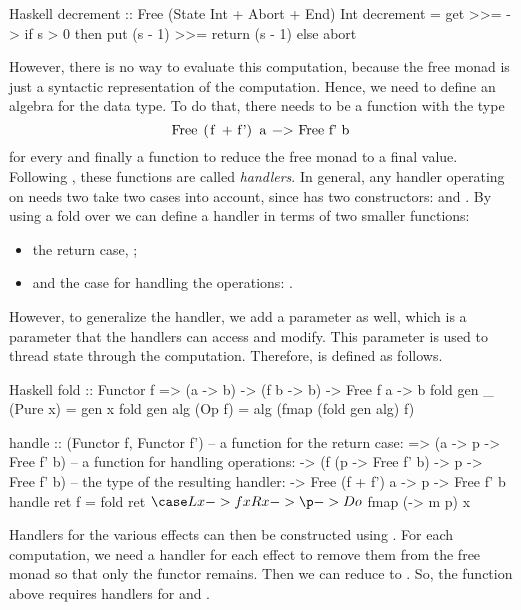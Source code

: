 \begin{lst}{Haskell}
decrement :: Free (State Int + Abort + End) Int
decrement = get >>= \s ->
              if s > 0
              then put (s - 1) >>= return (s - 1)
              else abort 
\end{lst}
%
However, there is no way to evaluate this computation, because the free monad is just a syntactic representation of the computation. Hence, we need to define an algebra for the  data type. To do that, there needs to be a function with the type
\[\mcode{Free (f + f') a -> Free f' b}\]
for every  and finally a function  to reduce the free monad to a final value. Following \textcite{castagna_handlers_2009}, these functions are called \emph{handlers}. In general, any handler operating on  needs two take two cases into account, since  has two constructors:  and . By using a fold over  we can define a handler in terms of two smaller functions:
\begin{itemize}
    \item the return case, ;
    \item and the case for handling the operations: .
\end{itemize}
However, to generalize the handler, we add a parameter  as well, which is a parameter that the handlers can access and modify. This parameter is used to thread state through the computation. Therefore,  is defined as follows.

\begin{lst}{Haskell}
fold :: Functor f => (a -> b) -> (f b -> b) -> Free f a -> b
fold gen _   (Pure x) = gen x
fold gen alg (Op f)   = alg (fmap (fold gen alg) f)

handle :: (Functor f, Functor f')
          -- a function for the return case:
       => (a -> p -> Free f' b)
          -- a function for handling operations:
       -> (f (p -> Free f' b) -> p -> Free f' b)
          -- the type of the resulting handler: 
       -> Free (f + f') a -> p -> Free f' b
handle ret f = fold ret $
  \case
    L x -> f x
    R x -> \p -> Do $ fmap (\m -> m p) x
\end{lst}
%
Handlers for the various effects can then be constructed using . For each computation, we need a handler for each effect to remove them from the free monad so that only the  functor remains. Then we can reduce  to . So, the  function above requires handlers for  and .


